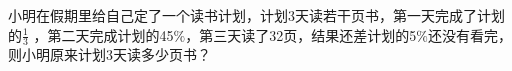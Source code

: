 小明在假期里给自己定了一个读书计划，计划3天读若干页书，第一天完成了计划的$\frac{1}{3}$ ，第二天完成计划的45$\%$，第三天读了32页，结果还差计划的5$\%$还没有看完，则小明原来计划3天读多少页书？



